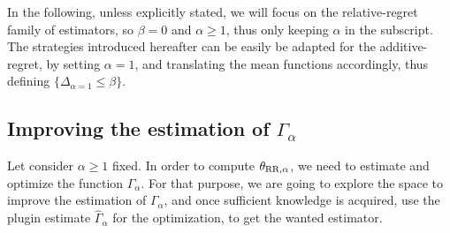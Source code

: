 \documentclass[../../Main_ManuscritThese.tex]{subfiles}
\begin{document}
In the following, unless explicitly stated, we will focus on the relative-regret family of estimators, so $\beta=0$ and $\alpha \geq 1$, thus only keeping $\alpha$ in the subscript.
The strategies introduced hereafter can be easily be adapted for the additive-regret, by setting $\alpha=1$, and translating the mean functions accordingly, thus defining $\{\Delta_{\alpha=1} \leq \beta \}$.









\subsection{Improving the estimation of $\Gamma_{\alpha}$}
\label{sec:evaluation_gamma}
Let consider $\alpha\geq 1$ fixed. In order to compute ${\theta}_{\mathrm{RR, \alpha}}$, we need to estimate and optimize the function $\Gamma_{\alpha}$. For that purpose, we are going to explore the space to improve the estimation of $\Gamma_{\alpha}$, and once sufficient knowledge is acquired, use the plugin estimate $\hat{\Gamma}_{\alpha}$ for the optimization, to get the wanted estimator.
\end{document}
